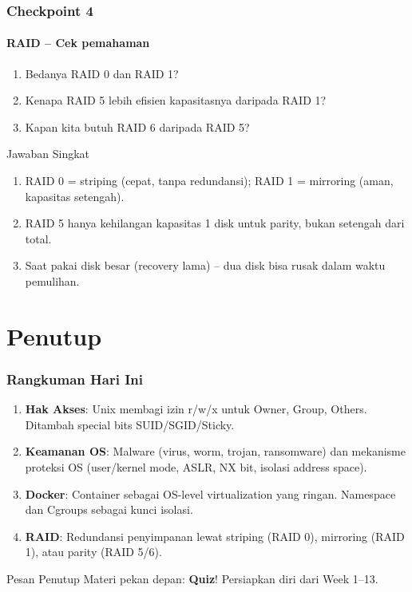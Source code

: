\documentclass[t,aspectratio=169,xcolor=dvipsnames]{beamer}
\begin{document}
\begin{frame}
    \frametitle{Checkpoint 4}
    \framesubtitle{RAID -- Cek pemahaman}
    \small
    \begin{enumerate}
        \item Bedanya RAID 0 dan RAID 1?
        \item Kenapa RAID 5 lebih efisien kapasitasnya daripada RAID 1?
        \item Kapan kita butuh RAID 6 daripada RAID 5?
    \end{enumerate}
    \vspace{0.3cm}
    \begin{block}{Jawaban Singkat}
        \begin{enumerate}
            \item RAID 0 = striping (cepat, tanpa redundansi); RAID 1 = mirroring (aman, kapasitas setengah).
            \item RAID 5 hanya kehilangan kapasitas 1 disk untuk parity, bukan setengah dari total.
            \item Saat pakai disk besar (recovery lama) -- dua disk bisa rusak dalam waktu pemulihan.
        \end{enumerate}
    \end{block}
\end{frame}

\section*{Penutup}

\begin{frame}[shrink=5]
    \frametitle{Rangkuman Hari Ini}
    \small
    \begin{enumerate}
        \item \textbf{Hak Akses}: Unix membagi izin r/w/x untuk Owner, Group, Others. Ditambah special bits SUID/SGID/Sticky.
        \item \textbf{Keamanan OS}: Malware (virus, worm, trojan, ransomware) dan mekanisme proteksi OS (user/kernel mode, ASLR, NX bit, isolasi address space).
        \item \textbf{Docker}: Container sebagai OS-level virtualization yang ringan. Namespace dan Cgroups sebagai kunci isolasi.
        \item \textbf{RAID}: Redundansi penyimpanan lewat striping (RAID 0), mirroring (RAID 1), atau parity (RAID 5/6).
    \end{enumerate}

    \vspace{0.2cm}
    \begin{exampleblock}{Pesan Penutup}
        \small
        Materi pekan depan: \textbf{Quiz}! Persiapkan diri dari Week 1--13.
    \end{exampleblock}
\end{frame}
\end{document}

